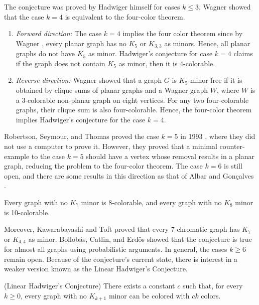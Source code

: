 The conjecture was proved by Hadwiger himself for cases $k \leq 3$. Wagner \cite{wagner_1937} showed that the case $k = 4$ is equivalent to the four-color theorem.
\begin{enumerate}
    \item \textit{Forward direction:} The case $k = 4$ implies the four color theorem since by Wagner \cite{wagner_1937}, every planar graph has no $K_5$ or $K_{3, 3}$ as 
 minors. Hence, all planar graphs do not have $K_5$ as minor. Hadwiger's conjecture for case $k = 4$ claims if the graph does not contain
    $K_5$ as minor, then it is $4$-colorable.
    \item \textit{Reverse direction:} Wagner \cite{wagner_1937} showed that a graph $G$ is $K_5$-minor free if it is obtained by 
clique sums of planar graphs and a Wagner graph $W$, where $W$ is a 3-colorable non-planar graph on eight vertices.
For any two four-colorable graphs, their clique sum is also four-colorable. Hence, the four-color theorem implies Hadwiger's conjecture
for the case $k = 4$.
\end{enumerate}

Robertson, Seymour, and Thomas proved the case $k = 5$ in 1993 \cite{robertson_seymour_1993}, 
where they did not use a computer to prove it. However, they proved that a minimal counter-example to the case $k = 5$ should have 
a vertex whose removal results in a planar graph, reducing the problem to the four-color theorem. The case $k = 6$ is still open, and there are some results in this direction as that of Albar and Gonçalves \cite{albar_goncalves_2013}. 
\begin{thm}
\label{thm:albargoncalves}
 Every graph with no $K_7$ minor is 8-colorable, and every graph with no $K_8$ minor is 10-colorable.
\end{thm}

Moreover, Kawarabayashi and Toft \cite{Kawarabayashi2005} proved that every 7-chromatic graph has $K_7$ or $K_{4,4}$ as minor.
Bollobás, Catlin, and Erdös \cite{BOLLOBAS1980195} showed that the conjecture is true for almost all graphs using
probabilistic arguments. In general, the cases $k \geq 6$ remain open.
Because of the conjecture's current state, there is interest in a weaker version known as the Linear Hadwiger's Conjecture.

\begin{conj} (Linear Hadwiger's Conjecture)
 There exists a constant $c$ such that, for every $k \geq 0$, every graph with no $K_{k+1}$ minor can be colored with $ck$ colors.
\end{conj}

